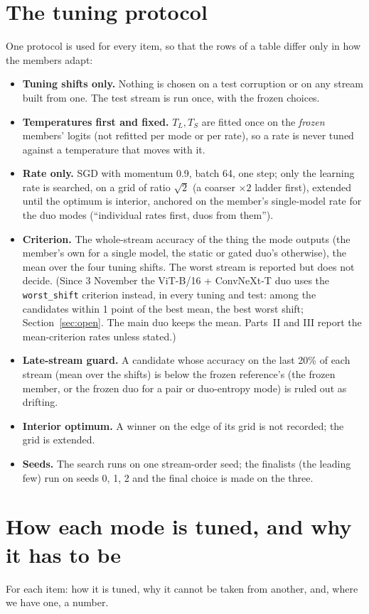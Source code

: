 \documentclass[10pt]{article}
\newcommand{\rl}[1]{\texttt{#1}}
\newcommand{\vit}{ViT-B/16}
\newcommand{\cnx}{ConvNeXt-T}
\begin{document}
\section{The tuning protocol}\label{sec:protocol}
One protocol is used for every item, so that the rows of a table differ only in how the members adapt:
\begin{itemize}
  \item \textbf{Tuning shifts only.} Nothing is chosen on a test corruption or on any stream built from one. The test stream is run once, with the frozen choices.
  \item \textbf{Temperatures first and fixed.} \(T_L, T_S\) are fitted once on the \emph{frozen} members' logits (not refitted per mode or per rate), so a rate is never tuned against a temperature that moves with it.
  \item \textbf{Rate only.} SGD with momentum 0.9, batch 64, one step; only the learning rate is searched, on a grid of ratio \(\sqrt2\) (a coarser \(\times2\) ladder first), extended until the optimum is interior, anchored on the member's single-model rate for the duo modes (``individual rates first, duos from them'').
  \item \textbf{Criterion.} The whole-stream accuracy of the thing the mode outputs (the member's own for a single model, the static or gated duo's otherwise), the mean over the four tuning shifts. The worst stream is reported but does not decide. (Since 3 November the \vit{} + \cnx{} duo uses the \rl{worst\_shift} criterion instead, in every tuning and test: among the candidates within 1 point of the best mean, the best worst shift; Section~\ref{sec:open}. The main duo keeps the mean. Parts~II and III report the mean-criterion rates unless stated.)
  \item \textbf{Late-stream guard.} A candidate whose accuracy on the last 20\% of each stream (mean over the shifts) is below the frozen reference's (the frozen member, or the frozen duo for a pair or duo-entropy mode) is ruled out as drifting.
  \item \textbf{Interior optimum.} A winner on the edge of its grid is not recorded; the grid is extended.
  \item \textbf{Seeds.} The search runs on one stream-order seed; the finalists (the leading few) run on seeds 0, 1, 2 and the final choice is made on the three.
\end{itemize}

\section{How each mode is tuned, and why it has to be}\label{sec:each}
For each item: how it is tuned, why it cannot be taken from another, and, where we have one, a number.
\end{document}
